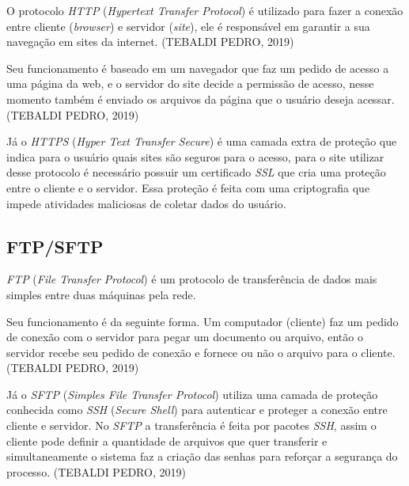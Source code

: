 \par O protocolo \textit{HTTP} (\textit{Hypertext Transfer Protocol}) é utilizado para fazer a conexão entre cliente (\textit{browser}) e servidor (\textit{site}), ele é responsável em garantir a sua navegação em sites da internet. (TEBALDI PEDRO, 2019)

\par Seu funcionamento é baseado em um navegador que faz um pedido de acesso a uma página da web, e o servidor do site decide a permissão de acesso, nesse momento também é enviado os arquivos da página que o usuário deseja acessar. (TEBALDI PEDRO, 2019)

\par Já o\textit{ HTTPS} (\textit{Hyper Text Transfer Secure}) é uma camada extra de proteção que indica para o usuário quais sites são seguros para o acesso, para o site utilizar desse protocolo é necessário possuir um certificado \textit{SSL} que cria uma proteção entre o cliente e o servidor. Essa proteção é feita com uma criptografia que impede atividades maliciosas de coletar dados do usuário.

\newpage\thispagestyle{empty}
\subsection{\textbf{FTP/SFTP}}

\par \textit{FTP} (\textit{File Transfer Protocol}) é um protocolo de transferência de dados mais simples entre duas máquinas pela rede.

\par Seu funcionamento é da seguinte forma. Um computador (cliente) faz um pedido de conexão com o servidor para pegar um documento ou arquivo, então o servidor recebe seu pedido de conexão e fornece ou não o arquivo para o cliente. (TEBALDI PEDRO, 2019)

\par Já o \textit{SFTP} (\textit{Simples File Transfer Protocol}) utiliza uma camada de proteção conhecida como \textit{SSH} (\textit{Secure Shell}) para autenticar e proteger a conexão entre cliente e servidor. No\textit{ SFTP} a transferência é feita por pacotes \textit{SSH}, assim o cliente pode definir a quantidade de arquivos que quer transferir e simultaneamente o sistema faz a criação das senhas para reforçar a segurança do processo. (TEBALDI PEDRO, 2019)

